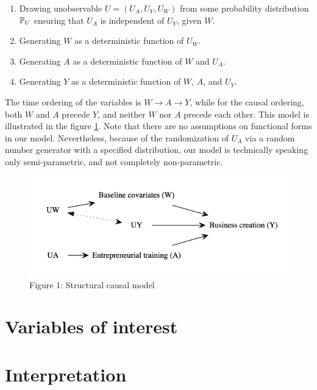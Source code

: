 \documentclass[oneside, notitlepage]{book}
\begin{document}
\begin{enumerate}
\item Drawing unobservable $U=(U_A, U_Y, U_W)$ from some probability distribution $\mathbb{P}_U$ ensuring that $U_A$ is independent of $U_Y$, given $W$.
\item Generating $W$ as a deterministic function of $U_W$.
\item Generating $A$ as a deterministic function of $W$ and $U_A$.
\item Generating $Y$ as a deterministic function of $W$, $A$, and $U_Y$.
\end{enumerate} 

The time ordering of the variables is $W \to A \to Y$, while for the causal ordering, both $W$ and $A$ precede $Y$, and neither $W$ nor $A$ precede each other. This model is illustrated in the figure \ref{fig:DAG}. Note that there are no assumptions on functional forms in our model. Nevertheless, because of the randomization of $U_A$ via a random number generator with a specified distribution, our model is technically speaking only semi-parametric, and not completely non-parametric.\\

\begin{figure}[h]
  \centering
  \includegraphics{../../DAG_Uganda.png}
  \caption{Figure 1: Structural causal model\label{fig:DAG}}
\end{figure}



\section{Variables of interest}
\label{sec:variables-interest}



\section{Interpretation}
\label{sec:interpretation}
\end{document}
